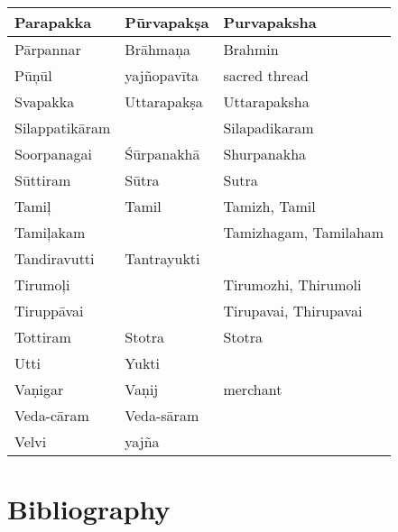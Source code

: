 \begin{longtable}{|m{2.5cm}|m{2.5cm}|>{\raggedright}m{3cm}|}
\hline
Parapakka & Pūrvapakṣa & Purvapaksha \tabularnewline
\hline
Pārpannar & Brāhmaņa & Brahmin \tabularnewline
\hline
Pūņūl & yajñopavīta & sacred thread \tabularnewline
\hline
Svapakka & Uttarapakṣa & Uttarapaksha \tabularnewline
\hline
Silappatikāram &  & Silapadikaram \tabularnewline
\hline
Soorpanagai & Śūrpanakhā & Shurpanakha \tabularnewline
\hline
Sūttiram & Sūtra & Sutra \tabularnewline
\hline
Tamiļ & Tamil & Tamizh, Tamil \tabularnewline
\hline
Tamiļakam &  & Tamizhagam, Tamilaham \tabularnewline
\hline
Tandiravutti & Tantrayukti &  \tabularnewline
\hline
Tirumoļi &  & Tirumozhi, Thirumoli \tabularnewline
\hline
Tiruppāvai &  & Tirupavai, Thirupavai \tabularnewline
\hline
Tottiram & Stotra & Stotra \tabularnewline
\hline
Utti & Yukti &  \tabularnewline
\hline
Vaṇigar & Vaṇij & merchant \tabularnewline
\hline
Veda-cāram & Veda-sāram &  \tabularnewline
\hline
Velvi & yajña &  \tabularnewline
\hline
\end{longtable}


\section*{Bibliography}

